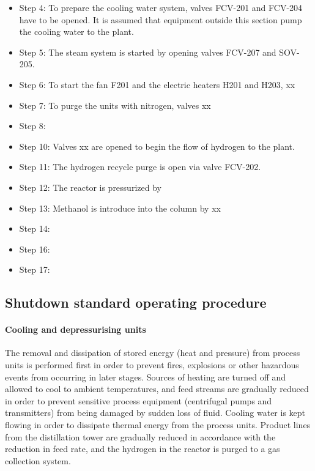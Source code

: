 \begin{itemize}
    \item Step 4: To prepare the cooling water system, valves FCV-201 and FCV-204 have to be opened. It is assumed that equipment outside this section pump the cooling water to the plant.
    \item Step 5: The steam system is started by opening valves FCV-207 and SOV-205.
    \item Step 6: To start the fan F201 and the electric heaters H201 and H203, xx
    \item Step 7: To purge the units with nitrogen, valves xx
    \item Step 8: 
    \item Step 10: Valves xx are opened to begin the flow of hydrogen to the plant.
    \item Step 11: The hydrogen recycle purge is open via valve FCV-202.
    \item Step 12: The reactor is pressurized by
    \item Step 13: Methanol is introduce into the column by xx
    \item Step 14:
    \item Step 16:
    \item Step 17:
\end{itemize}


\subsection{Shutdown standard operating procedure}

\paragraph{Cooling and depressurising units}
The removal and dissipation of stored energy (heat and pressure) from process units is performed first in order to prevent fires, explosions or other hazardous events from occurring in later stages. Sources of heating are turned off and allowed to cool to ambient temperatures, and feed streams are gradually reduced in order to prevent sensitive process equipment (centrifugal pumps and transmitters) from being damaged by sudden loss of fluid. Cooling water is kept flowing in order to dissipate thermal energy from the process units. Product lines from the distillation tower are gradually reduced in accordance with the reduction in feed rate, and the hydrogen in the reactor is purged to a gas collection system.

